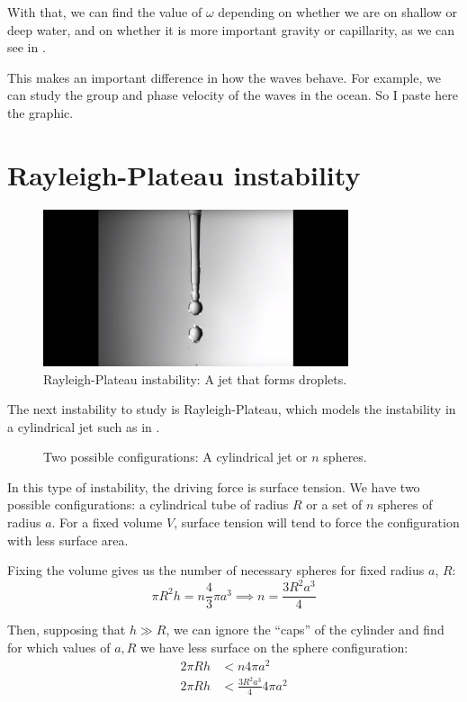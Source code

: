 \documentclass[palatino]{epflnotes}
\begin{document}
With that, we can find the value of $ω$ depending on whether we are on shallow or deep water, and on whether it is more important gravity or capillarity, as we can see in .

This makes an important difference in how the waves behave. For example, we can study the group and phase velocity of the waves in the ocean. So I paste here the graphic.

\section{Rayleigh-Plateau instability}
\label{sec:RayleighPlateau}

\begin{figure}[hbtp]
\centering
\includegraphics[width=0.8\textwidth]{img/RayleighPlateauInstability.png}
\caption{Rayleigh-Plateau instability: A jet that forms droplets.}
\label{fig:RayleighPlateau:Jet}
\end{figure}

The next instability to study is Rayleigh-Plateau, which models the instability in a cylindrical jet such as in .

\begin{figure}
\centering
{}
\caption{Two possible configurations: A cylindrical jet or $n$ spheres.}
\end{figure}

In this type of instability, the driving force is surface tension. We have two possible configurations: a cylindrical tube of radius $R$ or a set of $n$ spheres of radius $a$. For a fixed volume $V$, surface tension will tend to force the configuration with less surface area.

Fixing the volume gives us the number of necessary spheres for fixed radius $a$, $R$: \[ πR^2 h = n\frac{4}{3} πa^3 \implies n = \frac{3R^2 a^3}{4} \]

Then, supposing that $h \gg R$, we can ignore the ``caps'' of the cylinder and find for which values of $a, R$ we have less surface on the sphere configuration:
\begin{align*}
2πRh &< n4πa^2 \\
2πRh &< \frac{3R^2 a^3}{4} 4πa^2 \\
\end{align*}
\end{document}
